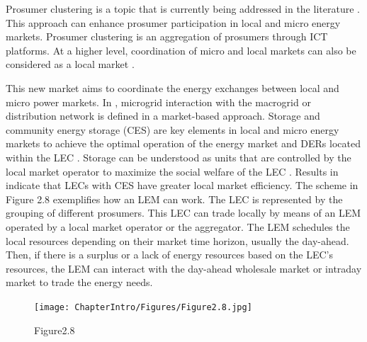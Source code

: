 Prosumer clustering is a topic that is currently being addressed in the literature \cite{doulamis2017virtual, vergados2016prosumer, da2013impact}. This approach can enhance prosumer participation in local and micro energy markets. Prosumer clustering is an aggregation of prosumers through ICT platforms.
At a higher level, coordination of micro and local markets can also be considered as a local market \cite{menniti2014future}.

This new market aims to coordinate the energy exchanges between local and micro power markets. In \cite{zachar2016microgrid}, microgrid interaction with the macrogrid or distribution network is defined in a market-based approach. 
Storage and community energy storage (CES) are key elements in local and micro energy markets to achieve the optimal operation of the energy market and DERs located within the LEC \cite{Olivella2016ENERGYCON, Bayram2014, mengelkamp2017role, Menniti2015, menniti2014management, mediwaththe2017competitive}. Storage can be understood as units that are controlled by the local market operator to maximize the social welfare of the LEC \cite{Olivella2016ENERGYCON}. Results in \cite{mengelkamp2017role} indicate that LECs with CES have greater local market efficiency. 
The scheme in Figure 2.8 exemplifies how an LEM can work. The LEC is represented by the grouping of different prosumers. This LEC can trade locally by means of an LEM operated by a local market operator or the aggregator. The LEM schedules the local resources depending on their market time horizon, usually the day-ahead. Then, if there is a surplus or a lack of energy resources based on the LEC's resources, the LEM can interact with the day-ahead wholesale market or intraday market to trade the energy needs.


\begin{figure}[]
	\centering
	\texttt{[image: ChapterIntro/Figures/Figure2.8.jpg]}
		\caption{Figure2.8}  
\end{figure}


